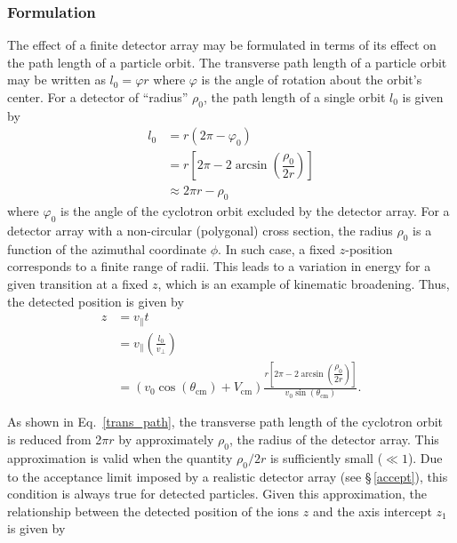 \subsubsection{Formulation}
The effect of a finite detector array may be formulated in terms of its effect on the path length of a particle orbit.  The transverse path length of a particle orbit may be written as $l_0=\varphi r$ where $\varphi$ is the angle of rotation about the orbit's center.  For a detector of ``radius'' $\rho_0$, the path length of a single orbit $l_0$ is given by 
\begin{equation}
\begin{split}
{l_0}&=r(2\pi-\varphi_0)\\
&=r\left[2\pi-2\arcsin\left(\dfrac{\rho_0}{2r}\right)\right]\\
&\approx 2\pi r-\rho_0
\end{split}	
\label{trans_path}
\end{equation}
where $\varphi_0$ is the angle of the cyclotron orbit excluded by the detector array.  For a detector array with a non-circular (polygonal) cross section, the radius $\rho_0$ is a function of the azimuthal coordinate $\phi$.  In such case, a fixed $z$-position corresponds to a finite range of radii.  This leads to a variation in energy for a given transition at a fixed $z$, which is an example of kinematic broadening.
  Thus, the detected position is given by 
\begin{equation}
\begin{split}
z&=v_\parallel t\\
&=v_\parallel \left(\frac{l_0}{v_{\perp}}\right)\\
&=(v_{0}\cos(\theta_\mathrm{cm})+V_\mathrm{cm})\frac{r\left[2\pi-2\arcsin\left(\dfrac{\rho_0}{2r}\right)\right]}{v_0\sin(\theta_\mathrm{cm})}.
\end{split}	
\label{z_defined}
\end{equation}
\par As shown in Eq.~\ref{trans_path}, the transverse path length of the cyclotron orbit is reduced from 2$\pi r$ by approximately $\rho_0$, the radius of the detector array.  This approximation is valid when the quantity $\rho_0/2r$ is sufficiently small ($\ll1$).  Due to the acceptance limit imposed by a realistic detector array (see \S\,\ref{accept}), this condition is always true for detected particles.  Given this approximation, the relationship between the detected position of the ions $z$ and  the axis intercept $z_1$ is given by
